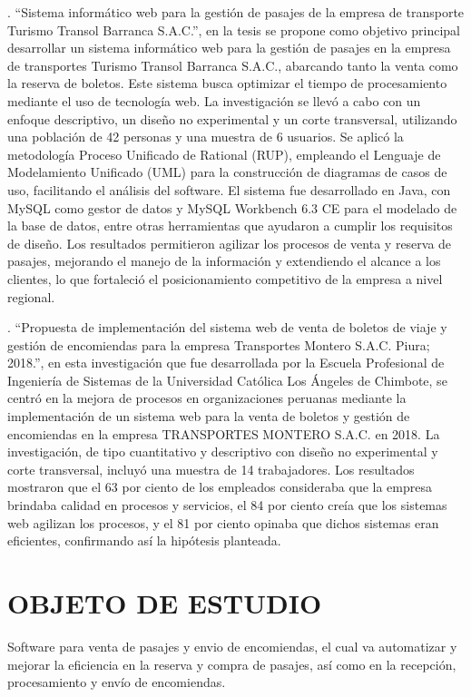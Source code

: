 \documentclass[12pt,letterpaper]{article}
\begin{document}
\textcite{sosa2019sistema}. ``Sistema informático web para la gestión de pasajes de la empresa de transporte Turismo Transol Barranca S.A.C.'', en la tesis se propone como objetivo principal desarrollar un sistema informático web para la gestión de pasajes en la empresa de transportes Turismo Transol Barranca S.A.C., abarcando tanto la venta como la reserva de boletos. Este sistema busca optimizar el tiempo de procesamiento mediante el uso de tecnología web. La investigación se llevó a cabo con un enfoque descriptivo, un diseño no experimental y un corte transversal, utilizando una población de 42 personas y una muestra de 6 usuarios. Se aplicó la metodología Proceso Unificado de Rational (RUP), empleando el Lenguaje de Modelamiento Unificado (UML) para la construcción de diagramas de casos de uso, facilitando el análisis del software. El sistema fue desarrollado en Java, con MySQL como gestor de datos y MySQL Workbench 6.3 CE para el modelado de la base de datos, entre otras herramientas que ayudaron a cumplir los requisitos de diseño. Los resultados permitieron agilizar los procesos de venta y reserva de pasajes, mejorando el manejo de la información y extendiendo el alcance a los clientes, lo que fortaleció el posicionamiento competitivo de la empresa a nivel regional.

\textcite{vivas2019propuesta}. ``Propuesta de implementación del sistema web de venta de boletos de viaje y gestión de encomiendas para la empresa Transportes Montero S.A.C. Piura; 2018.'', en esta investigación que fue desarrollada por la Escuela Profesional de Ingeniería de Sistemas de la Universidad Católica Los Ángeles de Chimbote, se centró en la mejora de procesos en organizaciones peruanas mediante la implementación de un sistema web para la venta de boletos y gestión de encomiendas en la empresa TRANSPORTES MONTERO S.A.C. en 2018. La investigación, de tipo cuantitativo y descriptivo con diseño no experimental y corte transversal, incluyó una muestra de 14 trabajadores. Los resultados mostraron que el 63 por ciento de los empleados consideraba que la empresa brindaba calidad en procesos y servicios, el 84 por ciento creía que los sistemas web agilizan los procesos, y el 81 por ciento opinaba que dichos sistemas eran eficientes, confirmando así la hipótesis planteada.

\section{OBJETO DE ESTUDIO}

Software para venta de pasajes y envio de encomiendas, el cual va automatizar y mejorar la eficiencia en la reserva y compra de pasajes, así como en la recepción, procesamiento y envío de encomiendas.
\end{document}
